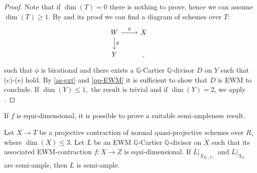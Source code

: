 \begin{proof}
	Note that if $\dim(T)=0$ there is nothing to prove, hence we can assume $\dim(T)\geq 1$. By \cite[Lemma 9.24]{bhatt2020} and its proof we can find a diagram of schemes over $T$:
	\[
	\begin{tikzcd}
	W \arrow[d, "g"] \arrow[r, "\phi"] & X  \\
	Y           &      ,
	\end{tikzcd}
	\]
	such that $\phi$ is birational and there exists a $\mathbb{Q}$-Cartier $\mathbb{Q}$-divisor $D$ on $Y$ such that (c)-(e) hold.
	By \autoref{as-ext} and \autoref{pp-EWM} it is sufficient to show that $D$ is EWM to conclude. If $\dim(Y) \leq 1,$ the result is trivial and if $\dim(Y)=2$, we apply \cite[Lemma 2.48]{bhatt2020}.
\end{proof}	

If $f$ is equi-dimensional, it is possible to prove a suitable semi-ampleness result.

\begin{proposition}\label{EDsemi-ampleness2}
	Let $X \to T$ be a projective contraction of normal quasi-projective schemes over $R$, where $\dim(X) \leq 3$.
	Let $L$ be an EWM $\mathbb{Q}$-Cartier $\mathbb{Q}$-divisor on $X$ such that its associated EWM-contraction $f \colon X \to Z$ is equi-dimensional.
	If $L|_{X_{K(T)}}$ and $L|_{X_{\mathbb{Q}}}$ are semi-ample, then $L$ is semi-ample.
\end{proposition}

